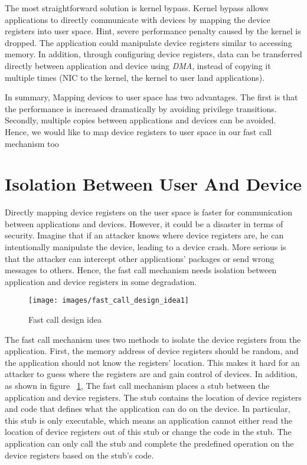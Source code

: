 The most straightforward 
solution is kernel bypass. Kernel bypass allows applications to directly 
communicate with devices by mapping the device registers into user space. 
Hint, severe performance penalty caused by the kernel is dropped. 
The application could manipulate device registers similar to accessing memory. 
In addition, through configuring device registers, data can be 
transferred directly between application and device using \emph{DMA}, 
instead of copying it multiple times (NIC to the kernel, the kernel to user land applications).

In summary, Mapping devices to user space has two advantages. 
The first is that the performance is increased dramatically 
by avoiding privilege transitions. Secondly, multiple copies 
between applications and devices can be avoided. 
Hence, we would like to map device registers to user space 
in our fast call mechanism too

\section{Isolation Between User And Device}



Directly mapping device registers on the user space 
is faster for communication between applications 
and devices. However, it could be a disaster in terms 
of security. Imagine that if an attacker knows where device
 registers are, he can intentionally manipulate the device, 
 leading to a device crash. More serious is that the attacker 
 can intercept other applications' packages or send wrong messages to others.  
Hence, the fast call mechanism needs isolation between application 
and device registers in some degradation. 

\begin{figure}[tbp]
  \centering
  \texttt{[image: images/fast\_call\_design\_idea1]}
  \caption[Short description]{Fast call design idea}
  \label{fig:fast_call_design_idea1}
\end{figure}

The fast call mechanism uses two methods to isolate the 
device registers from the application. First,  the memory 
address of device registers should be random, and the 
application should not know the registers' location. 
This makes it hard for an attacker to guess where the 
registers are and gain control of devices.  In addition, 
as shown in figure ~\ref{fig:fast_call_design_idea1}, The 
fast call mechanism places a stub between the application 
and device registers. The stub contains the location of device 
registers and code that defines what the application can do on 
the device. In particular, this stub is only executable, which 
means an application cannot either read the location of device 
registers out of this stub or change the code in the stub. 
The application can only call the stub and complete the predefined 
operation on the device registers based on the stub's code. 	 

